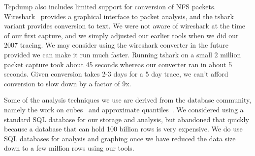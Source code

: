 
Tcpdump also includes limited support for conversion of NFS packets.
Wireshark~\cite{wireshark} provides a graphical interface to packet
analysis, and the tshark variant provides conversion to text.  We were
not aware of wireshark at the time of our first capture, and we simply
adjusted our earlier tools when we did our 2007 tracing.  We may
consider using the wireshark converter in the future provided we can
make it run much faster.  Running tshark on a small 2 million packet
capture took about 45 seconds whereas our converter ran in about 5
seconds.  Given conversion takes 2-3 days for a 5 day trace, we can't
afford conversion to slow down by a factor of 9x.

Some of the analysis techniques we use are derived from the database
community, namely the work on cubes~\cite{gray97cube} and approximate
quantiles~\cite{Manku98approximatemedians}.  We considered using a
standard SQL database for our storage and analysis, but abandoned that
quickly because a database that can hold 100 billion rows is
very expensive.  We do use SQL databases for analysis and graphing
once we have reduced the data size down to a few million rows using
our tools.




